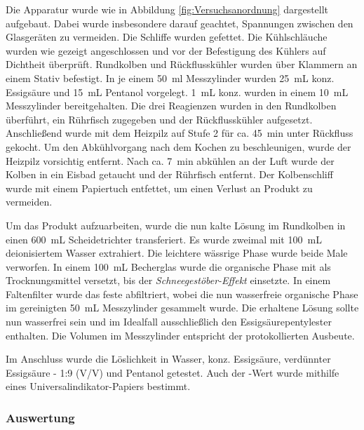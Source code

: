 \documentclass{article}
\begin{document}
        Die Apparatur wurde wie in Abbildung \ref{fig:Versuchsanordnung} dargestellt aufgebaut. Dabei wurde insbesondere darauf geachtet, Spannungen zwischen den Glasgeräten zu vermeiden. Die Schliffe  wurden gefettet. Die Kühlschläuche wurden wie gezeigt angeschlossen und vor der Befestigung des Kühlers auf Dichtheit überprüft. Rundkolben und Rückflusskühler wurden über Klammern an einem Stativ befestigt. In je einem \SI[mode=text,separate-uncertainty]{50}{\milli\litre} Messzylinder wurden \SI[mode=text]{25}{\milli\liter} konz. Essigsäure und \SI[mode=text]{15}{\milli\liter} Pentanol vorgelegt. \SI[mode=text]{1}{\milli\liter} konz.  wurden in einem \SI[mode=text]{10}{\milli\liter} Messzylinder bereitgehalten. Die drei Reagienzen wurden in den Rundkolben überführt, ein Rührfisch zugegeben und der Rückflusskühler aufgesetzt. Anschließend wurde mit dem Heizpilz auf Stufe 2 für ca. \SI[mode=text]{45}{\minute} unter Rückfluss gekocht. Um den Abkühlvorgang nach dem Kochen zu beschleunigen, wurde der Heizpilz vorsichtig entfernt. Nach ca. \SI[mode=text]{7}{\minute} abkühlen an der Luft wurde der Kolben in ein Eisbad getaucht und der Rührfisch entfernt. Der Kolbenschliff wurde mit einem Papiertuch entfettet, um einen Verlust an Produkt zu vermeiden.
        
        Um das Produkt aufzuarbeiten, wurde die nun kalte Lösung im Rundkolben in einen \SI[mode=text]{600}{\milli\liter} Scheidetrichter transferiert. Es wurde zweimal mit \SI[mode=text]{100}{\milli\liter} deionisiertem Wasser extrahiert. Die leichtere wässrige Phase wurde beide Male verworfen. In einem \SI[mode=text]{100}{\milli\liter} Becherglas wurde die organische Phase mit  als Trocknungsmittel versetzt, bis der \textit{Schneegestöber-Effekt} einsetzte. In einem Faltenfilter wurde das feste  abfiltriert, wobei die nun wasserfreie organische Phase im gereinigten \SI[mode=text]{50}{\milli\liter} Messzylinder gesammelt wurde. Die erhaltene Lösung sollte nun wasserfrei sein und im Idealfall ausschließlich den Essigsäurepentylester enthalten. Die Volumen im Messzylinder entspricht der protokollierten Ausbeute. 
        
        Im Anschluss wurde die Löslichkeit in Wasser, konz. Essigsäure, verdünnter Essigsäure - 1:9 (V/V) und Pentanol getestet. Auch der \pH-Wert wurde mithilfe eines Universalindikator-Papiers bestimmt. 
         
      \subsubsection{Auswertung} \label{sec:AuswertungSynthese}
    
\end{document}
